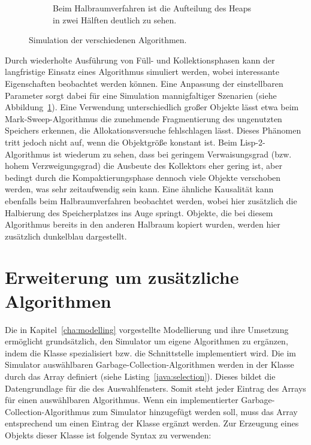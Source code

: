 \begin{figure}[p]
\begin{subfigure}{\textwidth}
		\caption{Beim Halbraumverfahren ist die Aufteilung des Heaps in zwei Hälften deutlich zu sehen.}
	\end{subfigure}
	\caption[Simulation der verschiedenen Algorithmen]{Simulation der verschiedenen Algorithmen.}
	\label{fig:simulation}
\end{figure}

Durch wiederholte Ausführung von Füll- und Kollektionsphasen kann der langfristige Einsatz eines Algorithmus simuliert werden, wobei interessante Eigenschaften beobachtet werden können.
Eine Anpassung der einstellbaren Parameter sorgt dabei für eine Simulation mannigfaltiger Szenarien (siehe Abbildung~\ref{fig:simulation}).
Eine Verwendung unterschiedlich großer Objekte lässt etwa beim Mark-Sweep-Algorithmus die zunehmende Fragmentierung des ungenutzten Speichers erkennen, die Allokationsversuche fehlschlagen lässt.
Dieses Phänomen tritt jedoch nicht auf, wenn die Objektgröße konstant ist.
Beim Lisp-2-Algorithmus ist wiederum zu sehen, dass bei geringem Verwaisungsgrad (bzw. hohem Verzweigungsgrad) die Ausbeute des Kollektors eher gering ist, aber bedingt durch die Kompaktierungsphase dennoch viele Objekte verschoben werden, was sehr zeitaufwendig sein kann.
Eine ähnliche Kausalität kann ebenfalls beim Halbraumverfahren beobachtet werden, wobei hier zusätzlich die Halbierung des Speicherplatzes ins Auge springt.
Objekte, die bei diesem Algorithmus bereits in den anderen Halbraum kopiert wurden, werden hier zusätzlich dunkelblau dargestellt.

\section{Erweiterung um zusätzliche Algorithmen}
\label{sec:extension}
Die in Kapitel~\ref{cha:modelling} vorgestellte Modellierung und ihre Umsetzung ermöglicht grundsätzlich, den Simulator um eigene Algorithmen zu ergänzen, indem die Klasse  spezialisiert bzw. die Schnittstelle  implementiert wird.
Die im Simulator auswählbaren Garbage-Collection-Algorithmen werden in der Klasse  durch das Array  definiert (siehe Listing~\ref{java:selection}).
Dieses bildet die Datengrundlage für die  des Auswahlfensters.
Somit steht jeder Eintrag des Arrays für einen auswählbaren Algorithmus.
Wenn ein implementierter Garbage-Collection-Algorithmus zum Simulator hinzugefügt werden soll, muss das Array entsprechend um einen Eintrag der Klasse  ergänzt werden.
Zur Erzeugung eines Objekts dieser Klasse ist folgende Syntax zu verwenden:

